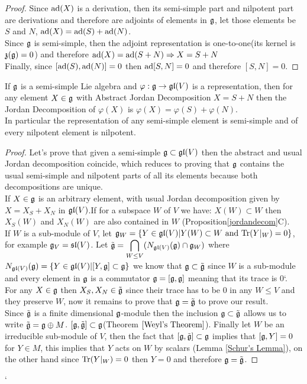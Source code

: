 \begin{proof}
Since $\text{ad}(X)$ is a derivation, then its semi-simple part and nilpotent part are derivations and therefore are adjoints of elements in $\mathfrak{g}$, let those elements be $S$ and $N$, $\text{ad}(X)=\text{ad}(S)+\text{ad}(N)$.\\
Since $\mathfrak{g}$ is semi-simple, then the adjoint representation is one-to-one(its kernel is $\mathfrak{z}(\mathfrak{g})=0$) and therefore $\text{ad}(X)=\text{ad}(S+N) \Rightarrow X=S+N$\\
Finally, since $[\text{ad}(S),\text{ad}(N)]=0$ then $\text{ad}[S,N]=0$ and therefore $[S,N]=0$.
\end{proof}
\begin{prop}
	If $\mathfrak{g}$ is a semi-simple Lie algebra and $\varphi:\mathfrak{g} \rightarrow \mathfrak{gl}(V)$ is a representation, then for any element $X \in \mathfrak{g}$ with Abstract Jordan Decomposition $X=S+N$ then the Jordan Decomposition of $\varphi(X)$ is $\varphi(X)=\varphi(S)+\varphi(N)$.\\
	In particular the representation of any semi-simple element is semi-simple and of every nilpotent element is nilpotent.
	\label{PreservationOfAbsJordan} 
\end{prop}
\begin{proof}
	Let's prove that given a semi-simple $\mathfrak{g} \subset \mathfrak{gl}(V)$ then the abstract and usual Jordan decomposition coincide, which reduces to proving that $\mathfrak{g}$ contains the usual semi-simple and nilpotent parts of all its elements because both decompositions are unique.\\
	If $X \in \mathfrak{g}$ is an arbitrary element, with usual Jordan decomposition given by $X=X_S+X_N$ in $\mathfrak{gl}(V)$.If for a subspace $W$ of $V$ we have: $X(W)\subset W$ then $X_S(W)$ and $X_N(W)$ are also contained in $W$ (Proposition\ref{jordandecom}C).\\
	If $W$ is a sub-module of $V$, let $\mathfrak{g}_W = \{Y \in \mathfrak{gl}(V)|Y(W)\subset W \text{ and } \text{Tr}(Y|_{W})=0\}$, for example $\mathfrak{g}_V = \mathfrak{sl}(V)$. Let $\tilde{\mathfrak{g}}=\displaystyle\bigcap_{W\le V} (N_{\mathfrak{gl}(V)}(\mathfrak{g}) \cap \mathfrak{g}_W)$ where $N_{\mathfrak{gl}(V)}(\mathfrak{g}) = \{Y \in \mathfrak{gl}(V)| [Y,\mathfrak{g}]\subset \mathfrak{g}\}$ we know that $\mathfrak{g}\subset \tilde{\mathfrak{g}}$ since $W$ is a sub-module and every element in $\mathfrak{g}$ is a commutator $\mathfrak{g}=[\mathfrak{g},\mathfrak{g}]$ meaning that its trace is $0$`.\\
	For any $X \in \mathfrak{g}$ then $X_S,X_N \in \tilde{\mathfrak{g}}$ since their trace has to be $0$ in any $W\le V$ and they preserve $W$, now it remains to prove that $\mathfrak{g}=\tilde{\mathfrak{g}}$ to prove our result.\\
	Since $\tilde{\mathfrak{g}}$ is a finite dimensional $\mathfrak{g}$-module then the inclusion $\mathfrak{g} \subset \tilde{\mathfrak{g}}$ allows us to write $\tilde{\mathfrak{g}} = \mathfrak{g} \oplus M$. $[\mathfrak{g},\tilde{\mathfrak{g}}]\subset \mathfrak{g}$(Theorem $\ref{Weyl's Theorem}$). Finally let $W$ be an irreducible sub-module of $V$, then the fact that $[\mathfrak{g},\tilde{\mathfrak{g}}]\subset \mathfrak{g}$ implies that $[\mathfrak{g},Y]=0$ for $Y \in M$, this implies that $Y$ acts on $W$ by scalars (Lemma \ref{Schur's Lemma}), on the other hand since $\text{Tr}(Y|_W)=0$ then $Y=0$ and therefore $\mathfrak{g} = \tilde{\mathfrak{g}}$.
\end{proof}
`